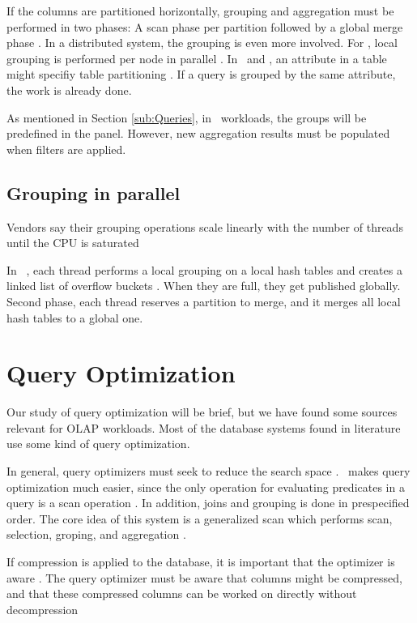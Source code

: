 If the columns are partitioned horizontally, grouping and aggregation must be performed in two phases: A scan phase per partition followed by a global merge phase \cite{Lemke2010-is}. In a distributed system, the grouping is even more involved. For \ibm, local grouping is performed per node in parallel \cite{Raman2013-em}. In \exasol~and \oracle, an attribute in a table might specifiy table partitioning \cite{Exasol2014-xh, Lahiri2015-mz}. If a query is grouped by the same attribute, the work is already done.

As mentioned in Section \ref{sub:Queries}, in \bd~workloads, the groups will be predefined in the panel. However, new aggregation results must be populated when filters are applied.

\subsection{Grouping in parallel}
\label{sub:Grouping in parallel}
Vendors say their grouping operations scale linearly with the number of threads until the CPU is saturated \cite{Farber2012-vh}

In \ibm~, each thread performs a local grouping on a local hash tables and creates a linked list of overflow buckets \cite{Raman2013-em}. When they are full, they get published globally. Second phase, each thread reserves a partition to merge, and it merges all local hash tables to a global one.

\section{Query Optimization}
\label{sec:Query Optimization}
Our study of query optimization will be brief, but we have found some sources relevant for OLAP workloads. Most of the database systems found in literature use some kind of query optimization. 

In general, query optimizers must seek to reduce the search space \cite{Boncz2002-yj, Stonebraker2005-qz}. \blink~makes query optimization much easier, since the only operation for evaluating predicates in a query is a scan operation \cite{Barber2012-xt}. In addition, joins and grouping is done in prespecified order. The core idea of this system is a generalized scan which performs scan, selection, groping, and aggregation \cite{Raman2008-gi}. 

If compression is applied to the database, it is important that the optimizer is aware \cite{Westmann200-mz}. The query optimizer must be aware that columns might be compressed, and that these compressed columns can be worked on directly without decompression \cite{Stonebraker2005-qz}

